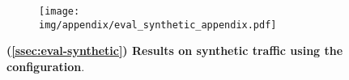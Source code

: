 \begin{figure}[h]
\centering
\vspace{-0.5em}
\captionsetup{justification=centering}
\begin{subfigure}{0.99 \columnwidth}
\centering
\texttt{[image: img/appendix/eval\_synthetic\_appendix.pdf]}
\end{subfigure}
\caption{\textbf{(\textsection \ref{ssec:eval-synthetic}) Results on synthetic traffic using the \textit{\name} configuration}.}

\label{fig:app-eval-synthetic}
\vspace{-2.2em}
\end{figure}
